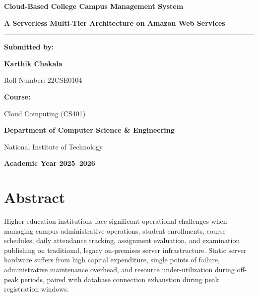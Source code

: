 \documentclass[12pt,a4paper]{report}
\begin{document}
\begin{titlepage}
\centering
\vspace*{1cm}

{\Huge \bfseries Cloud-Based College Campus Management System\par}
\vspace{0.5cm}
{\Large \bfseries A Serverless Multi-Tier Architecture on Amazon Web Services\par}

\vspace{1.5cm}
\rule{\linewidth}{0.5mm}
\vspace{1.5cm}

{\large \textbf{Submitted by:}\par}
\vspace{0.2cm}
{\Large \textbf{Karthik Chakala}\par}
{\large Roll Number: 22CSE0104\par}

\vspace{1.5cm}

{\large \textbf{Course:}\par}
{\large Cloud Computing (CS401)\par}
\vspace{0.5cm}
{\large \textbf{Department of Computer Science \& Engineering}\par}
{\large National Institute of Technology\par}

\vspace{2cm}

{\large \textbf{Academic Year 2025--2026}\par}

\vfill
\end{titlepage}

\chapter*{Abstract}

Higher education institutions face significant operational challenges when managing campus administrative operations, student enrollments, course schedules, daily attendance tracking, assignment evaluation, and examination publishing on traditional, legacy on-premises server infrastructure. Static server hardware suffers from high capital expenditure, single points of failure, administrative maintenance overhead, and resource under-utilization during off-peak periods, paired with database connection exhaustion during peak registration windows.
\end{document}
